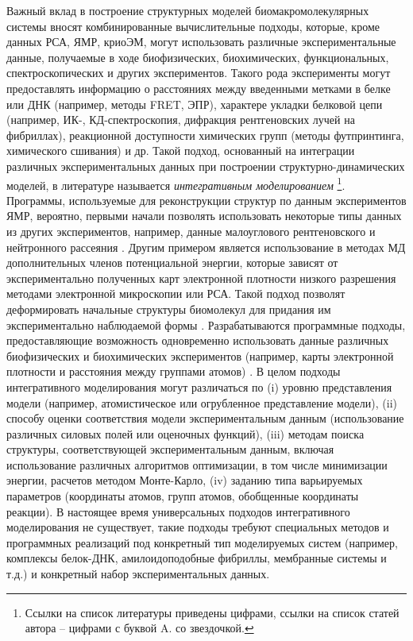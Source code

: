 Важный вклад в построение структурных моделей биомакромолекулярных системы вносят комбинированные вычислительные подходы, которые, кроме данных РСА, ЯМР, криоЭМ, могут использовать различные экспериментальные данные, получаемые в ходе биофизических, биохимических, функциональных, спектроскопических и других экспериментов. Такого рода эксперименты могут предоставлять информацию о расстояниях между введенными метками в белке или ДНК (например, методы FRET, ЭПР), характере укладки белковой цепи (например, ИК-, КД-спектроскопия, дифракция рентгеновских лучей на фибриллах), реакционной доступности химических групп (методы футпринтинга, химического сшивания) и др. Такой подход, основанный на интеграции различных экспериментальных данных при построении структурно-динамических моделей, в литературе называется \textit{интегративным моделированием} \cite{braitbard_integrative_2019}\footnote{Ссылки на список литературы приведены цифрами, ссылки на список статей автора -- цифрами \ifdefined\DISSER с буквой A. \else со звездочкой.\fi}. Программы, используемые для реконструкции структур по данным экспериментов ЯМР, вероятно, первыми начали позволять использовать некоторые типы данных из других экспериментов, например, данные малоуглового рентгеновского и нейтронного рассеяния  \cite{schwieters_xplor-nih_2003}. Другим примером является использование в методах МД дополнительных членов потенциальной энергии, которые зависят от экспериментально полученных карт электронной плотности низкого разрешения методами электронной микроскопии или РСА. Такой подход позволят деформировать начальные структуры биомолекул для придания им экспериментально наблюдаемой формы \cite{mcgreevy_xmdff_2014}. Разрабатываются программные подходы, предоставляющие возможность одновременно использовать данные различных биофизических и биохимических экспериментов (например, карты электронной плотности и расстояния между группами атомов) \cite{russel_putting_2012}. В целом подходы интегративного моделирования могут различаться по (i) уровню представления модели (например, атомистическое или огрубленное представление модели), (ii) способу оценки соответствия модели экспериментальным данным (использование различных силовых полей или оценочных функций), (iii) методам поиска структуры, соответствующей экспериментальным данным, включая использование различных алгоритмов оптимизации, в том числе минимизации энергии, расчетов методом Монте-Карло, (iv) заданию типа варьируемых параметров (координаты атомов, групп атомов, обобщенные координаты реакции). В настоящее время универсальных подходов интегративного моделирования не существует, такие подходы требуют специальных методов и программных реализаций под конкретный тип моделируемых систем (например, комплексы белок-ДНК, амилоидоподобные фибриллы, мембранные системы и т.д.) и конкретный набор экспериментальных данных.  
